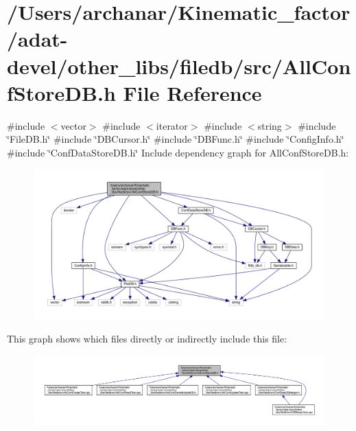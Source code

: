 \hypertarget{adat-devel_2other__libs_2filedb_2src_2AllConfStoreDB_8h}{}\section{/\+Users/archanar/\+Kinematic\+\_\+factor/adat-\/devel/other\+\_\+libs/filedb/src/\+All\+Conf\+Store\+DB.h File Reference}
\label{adat-devel_2other__libs_2filedb_2src_2AllConfStoreDB_8h}
{\ttfamily \#include $<$vector$>$}\newline
{\ttfamily \#include $<$iterator$>$}\newline
{\ttfamily \#include $<$string$>$}\newline
{\ttfamily \#include \char`\"{}File\+D\+B.\+h\char`\"{}}\newline
{\ttfamily \#include \char`\"{}D\+B\+Cursor.\+h\char`\"{}}\newline
{\ttfamily \#include \char`\"{}D\+B\+Func.\+h\char`\"{}}\newline
{\ttfamily \#include \char`\"{}Config\+Info.\+h\char`\"{}}\newline
{\ttfamily \#include \char`\"{}Conf\+Data\+Store\+D\+B.\+h\char`\"{}}\newline
Include dependency graph for All\+Conf\+Store\+D\+B.\+h\+:
\nopagebreak
\begin{figure}[H]
\begin{center}
\leavevmode
\includegraphics[width=350pt]{d8/d44/adat-devel_2other__libs_2filedb_2src_2AllConfStoreDB_8h__incl}
\end{center}
\end{figure}
This graph shows which files directly or indirectly include this file\+:
\nopagebreak
\begin{figure}[H]
\begin{center}
\leavevmode
\includegraphics[width=350pt]{d6/d3a/adat-devel_2other__libs_2filedb_2src_2AllConfStoreDB_8h__dep__incl}
\end{center}
\end{figure}
